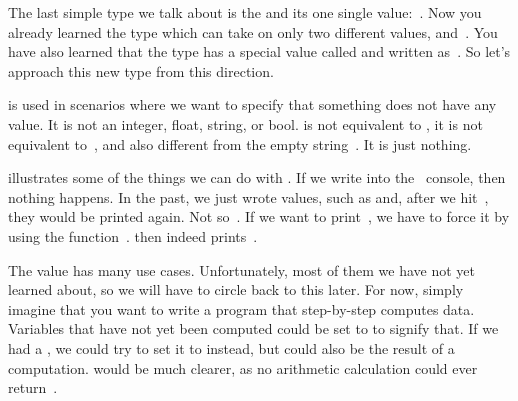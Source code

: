 %
\label{sec:none}%
%
%
%
%
The last simple type we talk about is the  and its one single value:~.
Now you already learned the type  which can take on only two different values,  and~.
You have also learned that the type  has a special value called  and written as~.
So let's approach this new type from this direction.

 is used in scenarios where we want to specify that something does not have any value.
It is not an integer, float, string, or bool.
 is not equivalent to , it is not equivalent to~, and also different from the empty string~\pythonIdx{\textquotedbl\textquotedbl}.
It is just nothing.

 illustrates some of the things we can do with .
If we write  into the \python\ console, then nothing happens.
In the past, we just wrote values, such as  and, after we hit~\keys{\return}, they would be printed again.
Not so~.
If we want to print~, we have to force it by using the function~.
 then indeed prints~.

The value  has many use cases.
Unfortunately, most of them we have not yet learned about, so we will have to circle back to this later.
For now, simply imagine that you want to write a program that step-by-step computes data.
Variables that have not yet been computed could be set to  to signify that.
If we had a , we could try to set it to  instead, but  could also be the result of a computation.
 would be much clearer, as no arithmetic calculation could ever return~.

